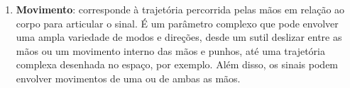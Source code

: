 \begin{enumerate}
        {capitulos/fundamentacao/imagens/orientacoes} %
        {height=8cm} %
        {Exemplos de orientações que podem ser assumidas pelas palmas das mãos} %
        {quadros-2004-estudos-linguisticos} %
    





    \item \textbf{Movimento}: corresponde à trajetória percorrida pelas mãos em relação ao corpo para articular o sinal. 
    É um parâmetro complexo que pode envolver uma ampla variedade de modos e direções, desde um sutil deslizar entre as mãos ou um movimento interno das mãos e punhos, até uma trajetória complexa desenhada no espaço, por exemplo.
    Além disso, os sinais podem envolver movimentos de uma ou de ambas as mãos.


 



\end{enumerate}
